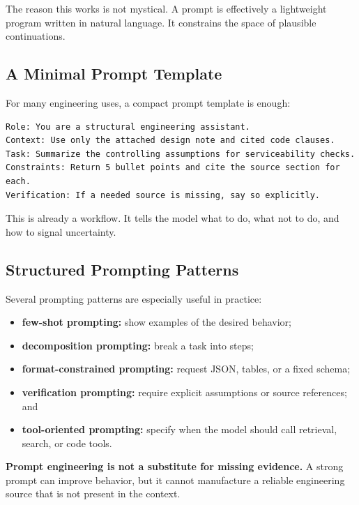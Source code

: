 \documentclass[12pt]{article}
\begin{document}
The reason this works is not mystical. A prompt is effectively a lightweight program written in natural language. It constrains the space of plausible continuations.

\subsection{A Minimal Prompt Template}

For many engineering uses, a compact prompt template is enough:
\begin{verbatim}
Role: You are a structural engineering assistant.
Context: Use only the attached design note and cited code clauses.
Task: Summarize the controlling assumptions for serviceability checks.
Constraints: Return 5 bullet points and cite the source section for each.
Verification: If a needed source is missing, say so explicitly.
\end{verbatim}

This is already a workflow. It tells the model what to do, what not to do, and how to signal uncertainty.

\subsection{Structured Prompting Patterns}

Several prompting patterns are especially useful in practice:
\begin{itemize}
    \item \textbf{few-shot prompting:} show examples of the desired behavior;
    \item \textbf{decomposition prompting:} break a task into steps;
    \item \textbf{format-constrained prompting:} request JSON, tables, or a fixed schema;
    \item \textbf{verification prompting:} require explicit assumptions or source references; and
    \item \textbf{tool-oriented prompting:} specify when the model should call retrieval, search, or code tools.
\end{itemize}

\begin{alert-box}
\textbf{Prompt engineering is not a substitute for missing evidence.} A strong prompt can improve behavior, but it cannot manufacture a reliable engineering source that is not present in the context.
\end{alert-box}
\end{document}
